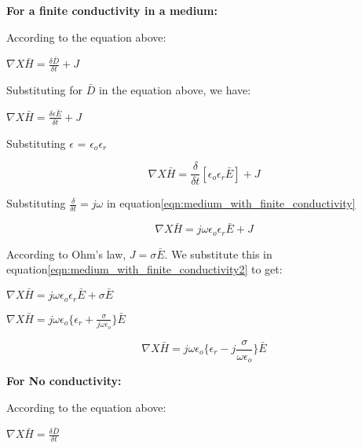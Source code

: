 \textbf{For a finite conductivity in a medium:}

According to the equation above:

\begin{center}
$\nabla X \bar{H} = \frac{\delta \bar{D}}{\delta t} + J$
\end{center}

Substituting for $\bar{D}$ in the equation above, we have:

\begin{center}
$\nabla X \bar{H} = \frac{\delta\epsilon\bar{E}}{\delta t} + J$
\end{center}

Substituting $\epsilon$ = $\epsilon_{o}\epsilon_{r}$

\begin{equation}
\nabla X \bar{H} = \frac{\delta}{\delta t}[\epsilon_{o}\epsilon_{r}\bar{E}] + J
\label{medium with finite conductivity}
\end{equation}

Substituting $\frac{\delta}{\delta t} = j\omega$ in equation\ref{eqn:medium_with_finite_conductivity}

\begin{equation}
\nabla X \bar{H} = j\omega\epsilon_{o}\epsilon_{r}\bar{E} + J
\label{eqn:medium_with_finite_conductivity2}
\end{equation}

According to Ohm's law, $J = \sigma\bar{E}$. We substitute this in equation\ref{eqn:medium_with_finite_conductivity2} to get:

\begin{center}
$\nabla X \bar{H} = j\omega\epsilon_{o}\epsilon_{r}\bar{E} + \sigma\bar{E}$ 
\end{center}

\begin{center}
$\nabla X \bar{H} = j\omega\epsilon_{o}\{\epsilon_{r} + \frac{\sigma}{j\omega\epsilon_{o}}\}\bar{E}$ 
\end{center}

\begin{equation}
\nabla X \bar{H} = j\omega\epsilon_{o}\Bigg\{\epsilon_{r} -j \frac{\sigma}{\omega\epsilon_{o}}\Bigg\}\bar{E} 
\end{equation}

\textbf{For No conductivity:}

According to the equation above:

\begin{center}
$\nabla X \bar{H} = \frac{\delta \bar {D}}{\delta t}$
\end{center}

